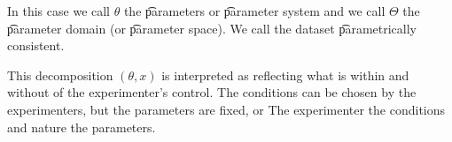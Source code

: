 In this case we call $\theta$ the \t{parameters} or \t{parameter system} and we call $\Theta$ the \t{parameter domain} (or \t{parameter space}).
We call the dataset \t{parametrically consistent}.

This decomposition $(\theta, x)$ is interpreted as reflecting what is within and without of the experimenter's control.
The conditions can be chosen by the experimenters, but the parameters are fixed, or 
The experimenter  the conditions and nature  the parameters.
